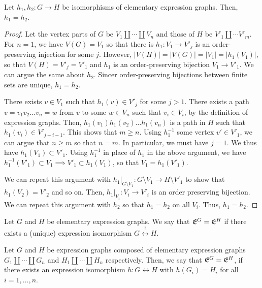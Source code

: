 \documentclass[./Thick_TQFTs_and_Quantum_Information.tex]{subfiles}
\begin{document}
\begin{thm}
Let $h_1, h_2 : G \to H$ be isomorphisms of elementary expression graphs. Then,
$h_1 = h_2$.
\end{thm}
\begin{proof}
Let the vertex parts of $G$ be $V_1 \amalg \cdots \amalg V_n$ and those of $H$
be $V'_1 \amalg \cdots V'_m$. For $n = 1$, we have $V(G) = V_1$ so that there is
$h_1 : V_1 \to V'_j$ is an order-preserving injection for some $j$. However,
$|V(H)| = |V(G)| = |V_1| = |h_1(V_1)|$, so that $V(H) = V'_j = V'_1$ and $h_1$
is an order-preserving bijection $V_1 \to V'_1$. We can argue the same about
$h_2$. Sincer order-preserving bijections between finite sets are unique,
$h_1 = h_2$.

There exists $v \in V_1$ such that $h_1(v) \in V'_j$ for some $j > 1$. There
exists a path $v = v_1v_2 \dots v_n = w$ from $v$ to some $w \in V_n$ such that
$v_i \in V_i$, by the definition of expression graphs. Then,
$h_1(v_1)h_1(v_2) \dots h_1(v_n)$ is a path in $H$ such that
$h_1(v_i) \in V'_{j + i - 1}$. This shows that $m \geq n$. Using $h_1^{-1}$ some
vertex $v' \in V'_1$, we can argue that $n \geq m$ so that $n = m$.
In particular, we must have $j = 1$. We thus have $h_1(V_1) \subset V'_1$. Using
$h_1^{-1}$ in place of $h_1$ in the above argument, we have
$h_1^{-1}(V'_1) \subset V_1 \implies V'_1 \subset h_1(V_1)$, so that
$V_1 = h_1(V'_1)$.

We can repeat this argument with
$h_1|_{G \setminus V_1} : G \setminus V_1 \to H \setminus V'_1$ to show that
$h_1(V_2) = V'_2$ and so on. Then, $h_1|_{V_i} : V_i \to V'_i$ is an order
preserving bijection. We can repeat this argument with $h_2$ so that
$h_1 = h_2$ on all $V_i$. Thus, $h_1 = h_2$.
\end{proof}

\begin{defn}
Let $G$ and $H$ be elementary expression graphs. We say that $\mathfrak{E}^{G} = \mathfrak{E}^{H}$
if there exists a (unique) expression isomorphism
$G \stackrel{!}{\longleftrightarrow} H$.
\end{defn}

\begin{defn}
Let $G$ and $H$ be expression graphs composed of elementary expression graphs
$G_1 \amalg \cdots \amalg G_n$ and $H_1 \amalg \cdots \amalg H_n$ respectively.
Then, we say that $\mathfrak{E}^{G} = \mathfrak{E}^{H}$, if there exists an expression isomorphism
$h : G \longleftrightarrow H$ with $h(G_i) = H_i$ for all $i = 1, \dots, n$.
\end{defn}
\end{document}

